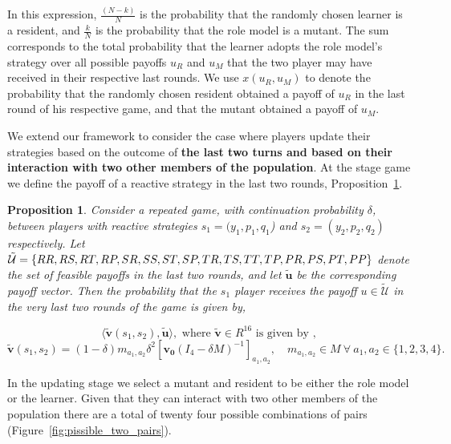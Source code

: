 \documentclass[11pt]{article}
\newcommand{\splitatcommas}[1]{%
  \begingroup
  \begingroup\lccode`~=`, \lowercase{\endgroup \edef~{\mathchar\the\mathcode`,
    \penalty0 \noexpand\hspace{0pt plus 1em}}%
  }\mathcode`,="8000 #1%
  \endgroup
}
\theoremstyle{plainCl1}
\newtheorem{Prop}{Proposition}
\theoremstyle{plainCl2}
\begin{document}
In this expression, $\frac{(N\!-\!k)}{N}$ is the probability that the randomly
chosen learner is a resident, and $\frac{k}{N}$ is the probability that the role
model is a mutant. The sum corresponds to the total probability that the learner
adopts the role model's strategy over all possible payoffs $u_R$ and $u_M$ that
the two player may have received in their respective last rounds. We use
$x(u_R,u_M)$ to denote the probability that the randomly chosen resident
obtained a payoff of $u_R$ in the last round of his respective game, and that
the mutant obtained a payoff of $u_M$.

We extend our framework to consider the case where players update their
strategies based on the outcome of \textbf{the last two turns and based on their
interaction with two other members of the population}. At the stage game we
define the payoff of a reactive strategy in the last two rounds,
Proposition~\ref{proposition:last_two_rounds}.

\begin{Prop}\label{proposition:last_two_rounds} Consider a repeated game, with
  continuation probability $\delta$, between players with reactive strategies
  $s_1\!=\!(y_1, p_1, q_1$)  and $s_2\!=\!(y_2,p_2,q_2)$ respectively. Let
  $\mathcal{\tilde{U}} = \splitatcommas{\{RR, RS, RT, RP, SR, SS, ST, SP, TR,
  TS, TT, TP, PR, PS, PT, PP\}}$ denote the set of feasible payoffs in the last
  two rounds, and let \(\tilde{\mathbf{u}}\) be the corresponding payoff vector.
  Then the probability that the $s_1$ player receives the payoff $u\!\in\!
  \mathcal{\tilde{U}}$ in the very last two rounds of the game is given by,

  \begin{equation}
  \langle\mathbf{\tilde{v}}(s_1,s_2),\mathbf{\tilde{u}}\rangle, \text{ where } \mathbf{\tilde{v}} \in R^{16} \text{ is given by },
  \end{equation}
  \begin{equation}
    \mathbf{\tilde{v}}(s_1,s_2) = (1 - \delta) m_{a_1, a_2} \delta^2 \left[\mathbf{v_0}(I_4 - \delta M)^{-1}\right]_{a_1, a_2}, \quad  m_{a_1, a_2} \in M \ \forall \ a_1, a_2 \in \{1, 2, 3, 4\}.
  \end{equation}
\end{Prop}

In the updating stage we select a mutant and resident to be either the role
model or the learner. Given that they can interact with two other members of the
population there are a total of twenty four possible combinations of pairs
(Figure~\ref{fig:pissible_two_pairs}).
\end{document}
